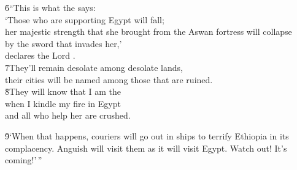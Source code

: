 \begin{poetry}
\poeml \v{6}``This is what the  says: \\
\poeml `Those who are supporting Egypt will fall; \\
\poemll    her majestic strength that she brought from the Aswan fortress will collapse \\
\poemlll       by the sword that invades her,' \\
\poeml declares the Lord . \\
\poeml \v{7}They'll remain desolate among desolate lands, \\
\poemll    their cities will be named among those that are ruined. \\
\poeml \v{8}They will know that I am the  \\
\poemll    when I kindle my fire in Egypt \\
\poemlll       and all who help her are crushed.
\end{poetry}

\v{9}`When that happens, couriers will go out in ships to terrify Ethiopia in its complacency. Anguish will visit them as it will visit Egypt. Watch out! It's coming!'\,''

